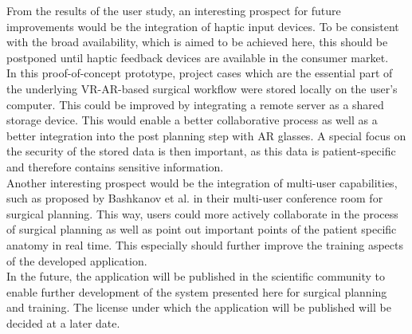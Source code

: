 From the results of the user study, an interesting prospect for
future improvements would be the integration of 
haptic input devices. 
To be consistent with the broad availability, which is
aimed to be achieved here, this should be postponed
until haptic feedback devices are available
in the consumer market. 
\\ In this proof-of-concept prototype, project
cases which are the essential part of the underlying VR-AR-based
surgical workflow were stored locally on the user's 
computer. This could be improved by integrating a remote server as 
a shared storage device. 
This would enable a better collaborative process as well as a 
better integration into the post planning step with AR glasses.
A special focus on the security of the stored data is then 
important, as this data is patient-specific and therefore 
contains sensitive information.
\\ Another interesting prospect would be the integration of multi-user
capabilities, such as proposed by Bashkanov et al. \cite{RN43} in their
multi-user conference room for surgical planning. 
This way, users could more actively collaborate in the process 
of surgical planning as well as point out 
important points of the patient specific anatomy in real time.
This especially should further improve the training aspects of 
the developed application. 
\\ In the future, the application will be published in the scientific community to enable further development of the system presented here for surgical planning and training.
The license under which the application will be published will be decided at a later date.